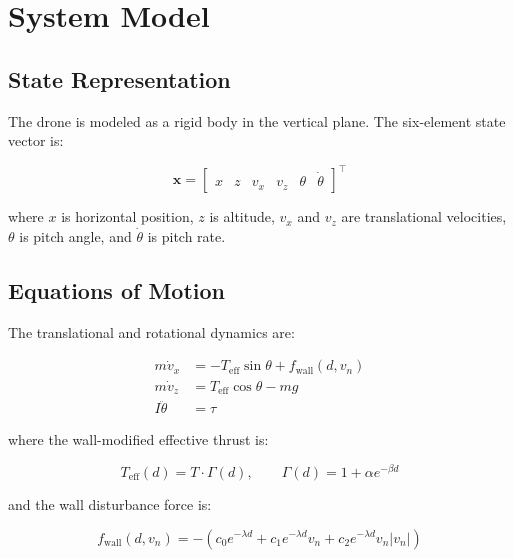 \documentclass[12pt]{article}
\begin{document}
\section{System Model}

\subsection{State Representation}

The drone is modeled as a rigid body in the vertical plane. The six-element
state vector is:

\begin{equation}
    \mathbf{x} = \begin{bmatrix} x & z & v_x & v_z & \theta & \dot{\theta} \end{bmatrix}^\top
\end{equation}

where $x$ is horizontal position, $z$ is altitude, $v_x$ and $v_z$ are
translational velocities, $\theta$ is pitch angle, and $\dot{\theta}$ is
pitch rate.

\subsection{Equations of Motion}

The translational and rotational dynamics are:

\begin{align}
    m\dot{v}_x &= -T_\mathrm{eff}\sin\theta + f_\mathrm{wall}(d, v_n) \\
    m\dot{v}_z &= T_\mathrm{eff}\cos\theta - mg \\
    I\ddot{\theta} &= \tau
\end{align}

where the wall-modified effective thrust is:

\begin{equation}
    T_\mathrm{eff}(d) = T \cdot \Gamma(d), \qquad
    \Gamma(d) = 1 + \alpha e^{-\beta d}
\end{equation}

and the wall disturbance force is:

\begin{equation}
    f_\mathrm{wall}(d, v_n) = -\left(c_0 e^{-\lambda d}
    + c_1 e^{-\lambda d} v_n
    + c_2 e^{-\lambda d} v_n |v_n|\right)
\end{equation}
\end{document}

